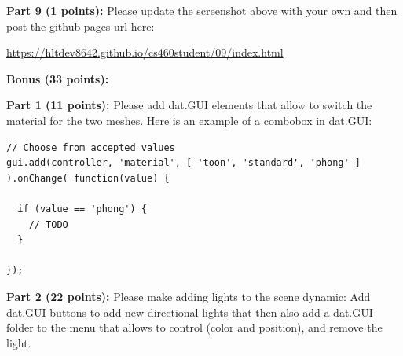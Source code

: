 \documentclass[10pt,oneside,onecolumn,letterpaper]{article}
\begin{document}
\vspace{3cm}

\noindent\textbf{Part 9 (1 points):} Please update the screenshot above with your own and then post the github pages url here:

\vspace{.5cm}

\url{https://hltdev8642.github.io/cs460student/09/index.html}

\vspace{3cm}

\newpage

\noindent\textbf{Bonus (33 points):}

\vspace{.5cm}

\noindent\textbf{Part 1 (11 points):} Please add dat.GUI elements that allow to switch the material for the two meshes. Here is an example of a combobox in dat.GUI:

\vspace{.5cm}

\begin{verbatim}
// Choose from accepted values
gui.add(controller, 'material', [ 'toon', 'standard', 'phong' ] ).onChange( function(value) {
  
  if (value == 'phong') {
    // TODO
  }

});
\end{verbatim}

\vspace{.5cm}

\noindent\textbf{Part 2 (22 points):} Please make adding lights to the scene dynamic: Add dat.GUI buttons to add new directional lights that then also add a dat.GUI folder to the menu that allows to control (color and position), and remove the light.
\end{document}
